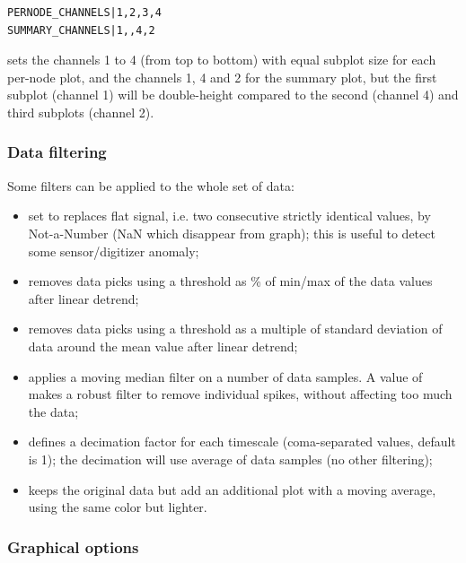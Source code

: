 \begin{lstlisting}
PERNODE_CHANNELS|1,2,3,4
SUMMARY_CHANNELS|1,,4,2
\end{lstlisting}

sets the channels 1 to 4 (from top to bottom) with equal subplot size for each per-node plot, and the channels 1, 4 and 2 for the summary plot, but the first subplot (channel 1) will be double-height compared to the second (channel 4) and third subplots (channel 2).


\subsubsection{Data filtering}

Some filters can be applied to the whole set of data:
\begin{itemize}
	\item {} set to  replaces flat signal, i.e. two consecutive strictly identical values, by Not-a-Number (NaN which disappear from graph); this is useful to detect some sensor/digitizer anomaly;
	\item {} removes data picks using a threshold as \% of min/max of the data values after linear detrend;
	\item {} removes data picks using a threshold as a multiple of standard deviation of data around the mean value after linear detrend;
	\item {} applies a moving median filter on a number of data samples. A value of  makes a robust filter to remove individual spikes, without affecting too much the data;
	\item {} defines a decimation factor for each timescale (coma-separated values, default is 1); the decimation will use average of data samples (no other filtering);
	\item {} keeps the original data but add an additional plot with a moving average, using the same color but lighter.
\end{itemize}


\subsubsection{Graphical options}

